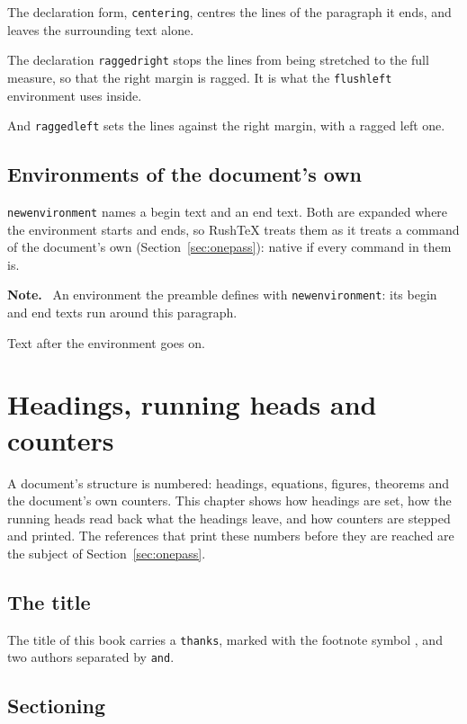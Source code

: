 \documentclass{article}
\numberwithin{equation}{section}
\newenvironment{rtnote}{\par\medskip\noindent\textbf{Note.}\ }{\par\medskip}
\theoremstyle{definition}
\theoremstyle{remark}
\begin{document}
{\centering The declaration form, \texttt{centering}, centres the lines of the paragraph
it ends, and leaves the surrounding text alone.\par}

{\raggedright The declaration \texttt{raggedright} stops the lines from being stretched
to the full measure, so that the right margin is ragged. It is what the
\texttt{flushleft} environment uses inside.\par}

{\raggedleft And \texttt{raggedleft} sets the lines against the right margin, with a
ragged left one.\par}

\subsection{Environments of the document's own}\label{sec:newenv}
\texttt{newenvironment} names a begin text and an end text. Both are expanded where the
environment starts and ends, so RushTeX treats them as it treats a command of the
document's own (Section~\ref{sec:onepass}): native if every command in them is.

\begin{rtnote}
An environment the preamble defines with \texttt{newenvironment}: its begin and end texts
run around this paragraph.
\end{rtnote}
Text after the environment goes on.

\section{Headings, running heads and counters}\label{sec:refs-chapter}
A document's structure is numbered: headings, equations, figures, theorems and the
document's own counters. This chapter shows how headings are set, how the running heads
read back what the headings leave, and how counters are stepped and printed. The
references that print these numbers before they are reached are the subject of
Section~\ref{sec:onepass}.

\subsection{The title}\label{sec:title}

The title of this book carries a \texttt{thanks}, marked with the footnote symbol
\textasteriskcentered, and two authors separated by \texttt{and}.

\subsection{Sectioning}
\end{document}
